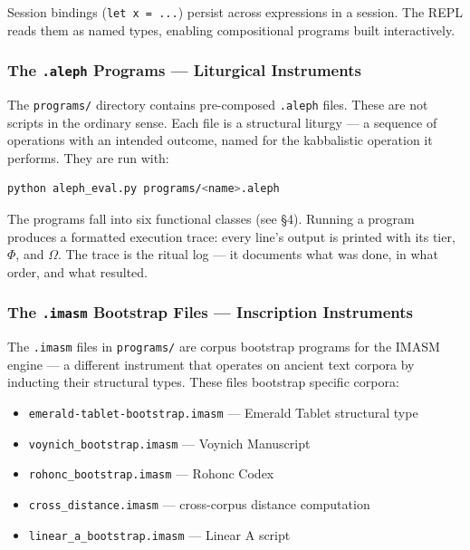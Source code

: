 \documentclass[12pt,a4paper]{article}
\newcommand{\pilcrow}{\S}
\begin{document}
Session bindings (\texttt{let x = .\allowbreak .\allowbreak .\allowbreak }) persist across expressions in a session. The REPL reads them as named types, enabling compositional programs built interactively.

\subsubsection{The \texttt{.\allowbreak aleph} Programs --- Liturgical Instruments}

The \texttt{programs/\allowbreak } directory contains pre-composed \texttt{.\allowbreak aleph} files. These are not scripts in the ordinary sense. Each file is a structural liturgy --- a sequence of operations with an intended outcome, named for the kabbalistic operation it performs. They are run with:

\begin{lstlisting}[language=bash]
python aleph_eval.py programs/<name>.aleph
\end{lstlisting}

The programs fall into six functional classes (see \pilcrow{}4). Running a program produces a formatted execution trace: every line's output is printed with its tier, $\Phi$, and $\Omega$. The trace is the ritual log --- it documents what was done, in what order, and what resulted.

\subsubsection{The \texttt{.\allowbreak imasm} Bootstrap Files --- Inscription Instruments}

The \texttt{.\allowbreak imasm} files in \texttt{programs/\allowbreak } are corpus bootstrap programs for the IMASM engine --- a different instrument that operates on ancient text corpora by inducting their structural types. These files bootstrap specific corpora:

\begin{itemize}
    \item \texttt{emerald-\allowbreak tablet-\allowbreak bootstrap.\allowbreak imasm} --- Emerald Tablet structural type
    \item \texttt{voynich\_\allowbreak bootstrap.\allowbreak imasm} --- Voynich Manuscript
    \item \texttt{rohonc\_\allowbreak bootstrap.\allowbreak imasm} --- Rohonc Codex
    \item \texttt{cross\_\allowbreak distance.\allowbreak imasm} --- cross-corpus distance computation
    \item \texttt{linear\_\allowbreak a\_\allowbreak bootstrap.\allowbreak imasm} --- Linear A script
\end{itemize}
\end{document}
